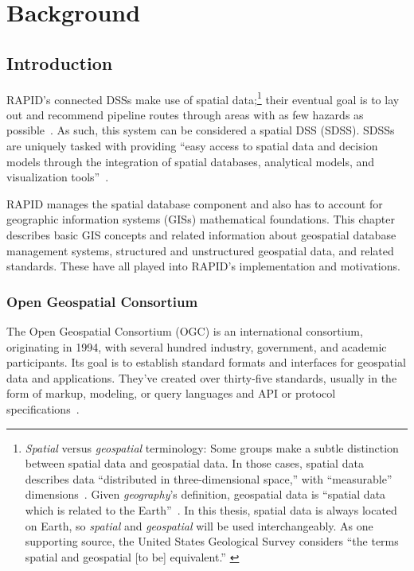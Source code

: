 \chapter{Background}
\label{background}

\section{Introduction}
\label{background_intro}
RAPID's connected DSSs make use of spatial data;\footnote{\textit{Spatial} versus \textit{geospatial} terminology: Some groups make a subtle distinction between spatial data and geospatial data. In those cases, spatial data describes data ``distributed in three-dimensional space,'' with ``measurable'' dimensions~\cite{Bhatta2011}. Given \textit{geography}'s definition, geospatial data is ``spatial data which is related to the Earth''~\cite{Bhatta2011}. In this thesis, spatial data is always located on Earth, so \textit{spatial} and \textit{geospatial} will be used interchangeably. As one supporting source, the United States Geological Survey considers ``the terms spatial and geospatial [to be] equivalent.''
\cite{Bhatta2011}} their eventual goal is to lay out and recommend pipeline routes through areas with as few hazards as possible~\cite{Dunning2013}. As such, this system can be considered a spatial DSS (SDSS). SDSSs are uniquely tasked with providing ``easy access to spatial data and decision models through the integration of spatial databases, analytical models, and visualization tools''~\cite{RedlandsSDSS}.

RAPID manages the spatial database component and also has to account for geographic information systems (GISs) mathematical foundations. This chapter describes basic GIS concepts and related information about geospatial database management systems, structured and unstructured geospatial data, and related standards. These have all played into RAPID's implementation and motivations.

\subsection{Open Geospatial Consortium}
The Open Geospatial Consortium (OGC) is an international consortium, originating in 1994, with several hundred industry, government, and academic participants. Its goal is to establish standard formats and interfaces for geospatial data and applications. They've created over thirty-five standards, usually in the form of markup, modeling, or query languages and API or protocol specifications~\cite{ogc}.

